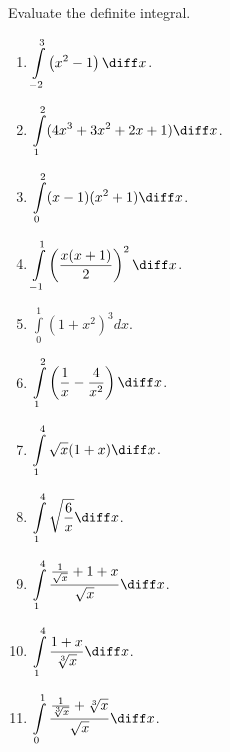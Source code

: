 Evaluate the definite integral.
\begin{multicols}{3}
\begin{enumerate}
\item $\displaystyle \int\limits_{-2}^{3} \left(x^2-1 \right)  \diff x$.


\item $\displaystyle \int\limits_{1}^{2} (4x^3+3x^2+2x+1)  \diff x$.

\item $\displaystyle \int\limits_{0}^{2}(x-1)(x^2+1)  \diff x$.

\item $\displaystyle \int\limits_{-1}^{1} \left( \frac{x(x+1) }{ 2} \right)^2  \diff x$.

\item $\displaystyle \int\limits_{0}^{1}(1+x^2)^3 dx$.

\item $\displaystyle \int \limits_{1}^{2} \left(\frac{1}{x} - \frac{4}{x^2} \right)  \diff x$.

\item $\displaystyle \int\limits_{1}^{4}\sqrt{x}(1+x) \diff x$.

\item $\displaystyle \int\limits_{1}^{4}\sqrt{\frac{6}{x}} \diff x$.

\answer{$\left[ \right]_{}^{}=$}
\item $\displaystyle \int \limits_{1}^{4} \frac{\frac{1}{\sqrt{x}}+1+x}{ \sqrt{x}}  \diff x$.

\answer{$\left[ \right]_{}^{}=$}
\item $\displaystyle \int \limits_{1}^{4} \frac{1+x}{ \sqrt[3]{x}} \diff x$.

\answer{$\left[ \right]_{}^{}=$}
\item $\displaystyle \int\limits_{0}^1 \frac{\frac{1}{\sqrt[3]{x}}+\sqrt[3]{x}}{ \sqrt{x}}\diff x$.


\end{enumerate}
\end{multicols}

